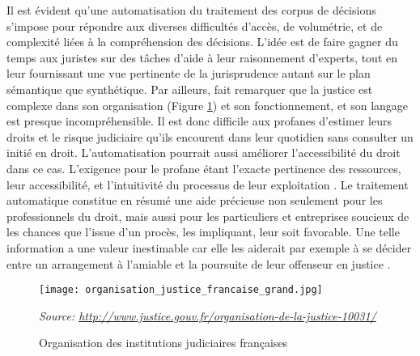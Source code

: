 Il est évident qu'une automatisation du traitement des corpus de décisions s'impose pour répondre aux diverses difficultés d'accès, de volumétrie, et de complexité liées à la compréhension des décisions. L'idée est de faire gagner du temps aux juristes sur des tâches d'aide à leur raisonnement d'experts, tout en leur fournissant une vue pertinente de la jurisprudence autant sur le plan sémantique que synthétique. Par ailleurs, \citet{cretin2014justicecomplexe} fait remarquer que la justice est complexe dans son organisation (Figure \ref{orgjusticefrance}) et son fonctionnement, et son langage est presque incompréhensible. Il est donc difficile aux profanes d'estimer leurs droits et le risque judiciaire qu'ils encourent dans leur quotidien sans consulter un initié en droit. L'automatisation pourrait aussi améliorer l'accessibilité du droit dans ce cas.  L'exigence pour le profane étant l'exacte pertinence des ressources, leur accessibilité, et l'intuitivité du processus de leur exploitation \citep{narazenko2017legalnlpintro}. Le traitement automatique constitue en résumé une aide précieuse non seulement pour les professionnels du droit, mais aussi pour les particuliers et entreprises soucieux de les chances que l'issue d'un procès, les impliquant, leur soit favorable. Une telle information a une valeur inestimable car elle les aiderait par exemple à se décider entre un arrangement à l'amiable et la poursuite de leur offenseur en justice \citep{langlaischappe2009ecoresolutionlitige}.

\begin{figure}
	\centering \texttt{[image: organisation\_justice\_francaise\_grand.jpg]}
	
	\textit{\scriptsize{Source: \url{http://www.justice.gouv.fr/organisation-de-la-justice-10031/}}}  
	\caption{Organisation des institutions judiciaires françaises} \label{orgjusticefrance}
\end{figure}

